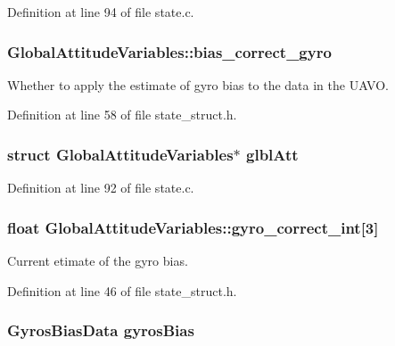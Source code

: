 Definition at line 94 of file state.\-c.

\hypertarget{group___state_ga3df4e05bd900b439ad746cbadce667d5}{
\subsubsection[{bias\-\_\-correct\-\_\-gyro}]{ Global\-Attitude\-Variables\-::bias\-\_\-correct\-\_\-gyro}}\label{group___state_ga3df4e05bd900b439ad746cbadce667d5}


Whether to apply the estimate of gyro bias to the data in the U\-A\-V\-O. 



Definition at line 58 of file state\-\_\-struct.\-h.

\hypertarget{group___state_ga76682d72011dc0109f1d5cf25a6c6da0}{
\subsubsection[{glbl\-Att}]{\setlength{\rightskip}{0pt plus 5cm}struct {\bf Global\-Attitude\-Variables}$\ast$ glbl\-Att}}\label{group___state_ga76682d72011dc0109f1d5cf25a6c6da0}


Definition at line 92 of file state.\-c.

\hypertarget{group___state_gac754011cf55a0c78cb770e48567802ba}{
\subsubsection[{gyro\-\_\-correct\-\_\-int}]{\setlength{\rightskip}{0pt plus 5cm}float Global\-Attitude\-Variables\-::gyro\-\_\-correct\-\_\-int\mbox{[}3\mbox{]}}}\label{group___state_gac754011cf55a0c78cb770e48567802ba}


Current etimate of the gyro bias. 



Definition at line 46 of file state\-\_\-struct.\-h.

\hypertarget{group___state_ga233a2d6850e9c466f80ae6bb2ebd98e8}{
\subsubsection[{gyros\-Bias}]{\setlength{\rightskip}{0pt plus 5cm}Gyros\-Bias\-Data gyros\-Bias}}\label{group___state_ga233a2d6850e9c466f80ae6bb2ebd98e8}


